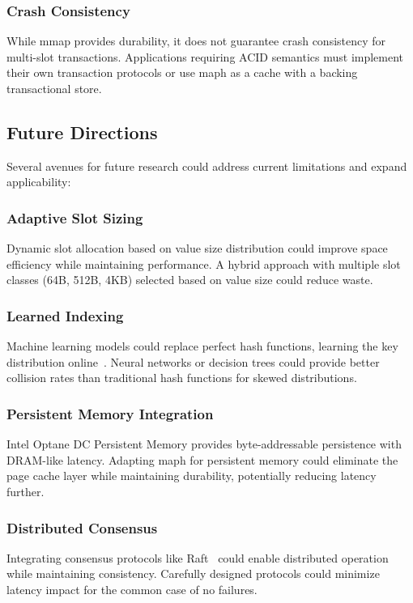 \documentclass[10pt,conference]{IEEEtran}
\begin{document}
\subsubsection{Crash Consistency}
While mmap provides durability, it does not guarantee crash consistency for multi-slot transactions. Applications requiring ACID semantics must implement their own transaction protocols or use maph as a cache with a backing transactional store.

\subsection{Future Directions}

Several avenues for future research could address current limitations and expand applicability:

\subsubsection{Adaptive Slot Sizing}
Dynamic slot allocation based on value size distribution could improve space efficiency while maintaining performance. A hybrid approach with multiple slot classes (64B, 512B, 4KB) selected based on value size could reduce waste.

\subsubsection{Learned Indexing}
Machine learning models could replace perfect hash functions, learning the key distribution online~\cite{learned-index}. Neural networks or decision trees could provide better collision rates than traditional hash functions for skewed distributions.

\subsubsection{Persistent Memory Integration}
Intel Optane DC Persistent Memory provides byte-addressable persistence with DRAM-like latency. Adapting maph for persistent memory could eliminate the page cache layer while maintaining durability, potentially reducing latency further.

\subsubsection{Distributed Consensus}
Integrating consensus protocols like Raft~\cite{raft} could enable distributed operation while maintaining consistency. Carefully designed protocols could minimize latency impact for the common case of no failures.
\end{document}
